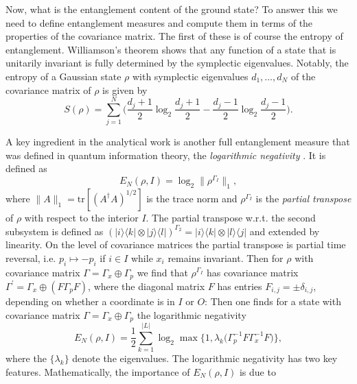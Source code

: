 \documentclass[12pt, rmp,floatfix,epsfig,graphics]{revtex4} %
\begin{document}
Now, what is the entanglement content of the ground state? To
answer this we need to define entanglement measures and compute 
them in terms of the properties of the covariance matrix. The first 
of these is of course the entropy of entanglement.
Williamson's theorem shows that any function of a state that is 
unitarily invariant is fully determined by the symplectic 
eigenvalues. Notably, the entropy of a Gaussian state $\rho$ 
with symplectic eigenvalues $d_1,\dots, d_N$ of the covariance matrix of $\rho$ is given by
\begin{equation*}
        S(\rho) =\sum_{j=1}^N \biggl(
        \frac{d_j+1}{2} \log_2 \frac{d_j+1}{2}
        - 
        \frac{d_j-1}{2}\log_2\frac{d_j-1}{2}
        \biggr).
\end{equation*}

A key ingredient in the analytical work is another full entanglement
measure that was defined in quantum information theory, the 
{\it logarithmic negativity} \cite{PhD,Volume,VidalNegativity,PlenioNegativity,InHouseReview,EisertPlenioneg}.
It is defined as  
\begin{equation*}
        E_{N}(\rho,I) = \log_2 \|\rho^{\Gamma_I}\|_1,
\end{equation*}
where $\|A\|_1=\text{tr}[(A^\dagger A)^{1/2}]$ is the trace norm
and $\rho^{\Gamma_I}$ is the {\it partial transpose} of $\rho$ with 
respect to the interior $I$. The partial transpose w.r.t. the 
second subsystem is defined as 
$(|i\rangle \langle k|\otimes|j\rangle \langle l|)^{\Gamma_2}=
|i\rangle \langle k|\otimes|l\rangle \langle j|$ and extended by linearity.
On the level of covariance matrices the partial transpose is 
partial time reversal, i.e. $p_i\mapsto -p_i$ if $i\in I$ while 
$x_i$ remains invariant. Then for $\rho$ with covariance matrix 
$\Gamma=\Gamma_x\oplus\Gamma_p$ we find that $\rho^{\Gamma_{I}}$ 
has covariance matrix $\Gamma^\prime = \Gamma_x\oplus 
(F\Gamma_pF)$, where the diagonal matrix 
$F$ has entries $F_{i,j}=\pm \delta_{i,j}$, depending on whether a coordinate is in 
$I$ or $O$:
Then one finds for a state with covariance matrix $\Gamma=\Gamma_x\oplus\Gamma_p$ the logarithmic negativity 
\cite{Harmonic,marcusThesis}
\begin{equation*}
        E_{N}(\rho,I) = \frac{1}{2}\sum_{k=1}^{|L|} \log_2\max \bigl\{1, \lambda_k\bigl(\Gamma_p^{-1}F\Gamma_x^{-1}F\bigr)\bigr\},
\end{equation*}
where the $\{\lambda_k\}$ denote the eigenvalues.
The logarithmic negativity has two key features. Mathematically, 
the importance of $E_{N}(\rho,I)$ is due to 
\end{document}
